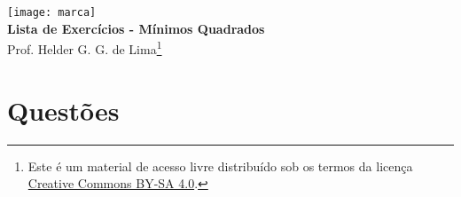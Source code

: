 \documentclass[12pt,a4paper]{article}
\author{\eu}
\title{\tipo}
\date{\data}
\newcommand{\IconPc}{\texttt{[image: computer.png]}}
\newcommand{\IconCalc}{\texttt{[image: calculator.png]}}
\newcommand{\IconThink}{\texttt{[image: pencil.png]}}
\newcommand{\IconCheck}{\texttt{[image: checkmark.png]}}
\newlength{\SmileysLength}
\newcommand{\calc}{\hspace*{-\SmileysLength}\makebox[0pt][r]{\IconCalc}%
   \hspace*{\SmileysLength}}
\newcommand{\software}{\hspace*{-\SmileysLength}\makebox[0pt][r]{\IconPc}%
   \hspace*{\SmileysLength}}
\newcommand{\teoria}{\hspace*{-\SmileysLength}\makebox[0pt][r]{\IconThink}%
   \hspace*{\SmileysLength}}
\newcommand{\conceito}{\hspace*{-\SmileysLength}\makebox[0pt][r]{\IconCheck}%
   \hspace*{\SmileysLength}}
\newcommand*\tipo{Lista de Exercícios - Mínimos Quadrados}
\newcommand*\eu{Helder G. G. de Lima}
\begin{document}
\begin{center}
\texttt{[image: marca]} \\
\textbf{\tipo} \\
Prof. \eu\footnote{
Este é um material de acesso livre distribuído sob os termos da licença \href{https://creativecommons.org/licenses/by-sa/4.0/deed.pt_BR}{Creative Commons BY-SA 4.0}.}
\end{center}


\section*{Questões}
\end{document}
